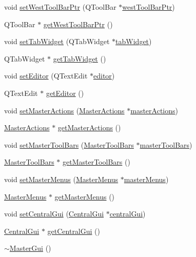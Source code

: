 \begin{DoxyCompactItemize}
void \hyperlink{class_master_gui_a768fa0a0b9cb7886f703b7b60f0b1f57}{set\-West\-Tool\-Bar\-Ptr} (Q\-Tool\-Bar $\ast$\hyperlink{class_master_gui_ad8bf561c56063077e97f9a993fa38ee4}{west\-Tool\-Bar\-Ptr})
\item 
Q\-Tool\-Bar $\ast$ \hyperlink{class_master_gui_a6863200bf96fb94a3afee4696762f259}{get\-West\-Tool\-Bar\-Ptr} ()
\item 
void \hyperlink{class_master_gui_a528332ae24456ea6efddaba74527852b}{set\-Tab\-Widget} (Q\-Tab\-Widget $\ast$\hyperlink{class_master_gui_a3bca8bd4cc4ecef70de27afff52a7b08}{tab\-Widget})
\item 
Q\-Tab\-Widget $\ast$ \hyperlink{class_master_gui_a6dd82c5ecf1ed32a4b67de6d4778b5d8}{get\-Tab\-Widget} ()
\item 
void \hyperlink{class_master_gui_ab468fb7b10a30bf6350bf030ce32a5fa}{set\-Editor} (Q\-Text\-Edit $\ast$\hyperlink{class_master_gui_a0681f0b3d1828d84c0c0cd7e4d765d98}{editor})
\item 
Q\-Text\-Edit $\ast$ \hyperlink{class_master_gui_a1f6fc301c337d7ec0e77425a3b6573c1}{get\-Editor} ()
\item 
void \hyperlink{class_master_gui_aa7ab2e7e8f2a5128eb8b6b14fc569ec4}{set\-Master\-Actions} (\hyperlink{class_master_actions}{Master\-Actions} $\ast$\hyperlink{class_master_gui_a85dc72333d336db18a92207a09db4ce3}{master\-Actions})
\item 
\hyperlink{class_master_actions}{Master\-Actions} $\ast$ \hyperlink{class_master_gui_a529d566a29d89fd686a5f8d37cad8aef}{get\-Master\-Actions} ()
\item 
void \hyperlink{class_master_gui_a355c5dcc87dc16c5bbe5b5917cc54392}{set\-Master\-Tool\-Bars} (\hyperlink{class_master_tool_bars}{Master\-Tool\-Bars} $\ast$\hyperlink{class_master_gui_afb90e8f19dae43cb78c8495e5708e68b}{master\-Tool\-Bars})
\item 
\hyperlink{class_master_tool_bars}{Master\-Tool\-Bars} $\ast$ \hyperlink{class_master_gui_a14e04dcaf7233f6ce5fce47b58e18ef5}{get\-Master\-Tool\-Bars} ()
\item 
void \hyperlink{class_master_gui_a377da4ce23db123d0e2cef68d2409e1d}{set\-Master\-Menus} (\hyperlink{class_master_menus}{Master\-Menus} $\ast$\hyperlink{class_master_gui_a27f793278e486a5bfec69ef366199e5d}{master\-Menus})
\item 
\hyperlink{class_master_menus}{Master\-Menus} $\ast$ \hyperlink{class_master_gui_ab2d15cb4a25f2fb75a10e01e0f93a850}{get\-Master\-Menus} ()
\item 
void \hyperlink{class_master_gui_a76571dfcf6fac7274f39e90d72929564}{set\-Central\-Gui} (\hyperlink{class_central_gui}{Central\-Gui} $\ast$\hyperlink{class_master_gui_a565fc5a3622b8b5417b26dd1306439b8}{central\-Gui})
\item 
\hyperlink{class_central_gui}{Central\-Gui} $\ast$ \hyperlink{class_master_gui_a8672503d8c79f2377f76a04791e56530}{get\-Central\-Gui} ()
\item 
\hyperlink{class_master_gui_a4eeae08177c54aba4aad160fc1c5efc6}{$\sim$\-Master\-Gui} ()
\end{DoxyCompactItemize}
